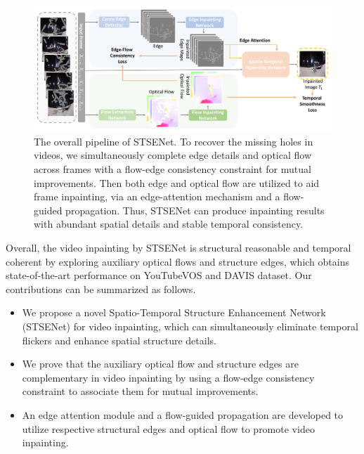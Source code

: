 \documentclass[letterpaper]{article} %
\begin{document}
\begin{figure}[t]
	\centering
	\includegraphics[width=2.0\columnwidth]{zong} %
	\caption{The overall pipeline of STSENet. To recover the missing holes in videos, we simultaneously complete edge details and optical flow across frames with a flow-edge consistency constraint for mutual improvements. Then both edge and optical flow are utilized to aid frame inpainting, via an edge-attention mechanism and a flow-guided propagation. Thus, STSENet can produce inpainting results with abundant spatial details and stable temporal consistency.}
	\label{zong}
\end{figure}




Overall, the video inpainting by STSENet is structural reasonable and temporal coherent by exploring auxiliary optical flows and structure edges, which obtains state-of-the-art performance on YouTubeVOS and DAVIS dataset. Our contributions can be summarized as follows.
\begin{itemize}
	\item We propose a novel Spatio-Temporal Structure Enhancement Network (STSENet) for video inpainting, which can simultaneously eliminate temporal flickers and enhance spatial structure details.
	\item We prove that the auxiliary optical flow and structure edges are complementary in video inpainting by using a flow-edge consistency constraint to associate them for mutual improvements.
	\item An edge attention module and a flow-guided propagation are developed to utilize respective structural edges and optical flow to promote video inpainting.			
\end{itemize}









%


%



 

 
\end{document}
